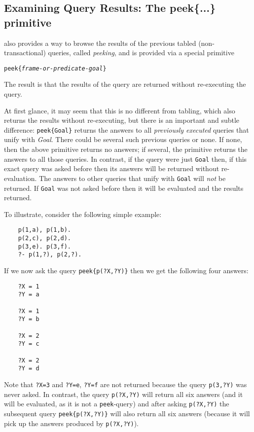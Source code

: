 
\subsection{Examining Query Results: The peek\{...\} primitive}
\label{sec-peek}

\ERGO also provides a way to browse the results of the previous tabled
(non-transactional) queries, called \emph{peeking}, and is provided via
a special primitive 
\begin{alltt}
    peek\{\textnormal{\textit{frame-or-predicate-goal}}\}
\end{alltt}
The result is that the results of the query are returned without
re-executing the query.

At first glance, it may seem that this is no different from tabling, which
also returns the results without re-executing, but there is an important
and subtle difference: \texttt{peek\{Goal\}} returns the answers to all
\emph{previously executed} queries that unify with \emph{Goal}. There could
be several such previous queries or none.   
If none, then the above primitive returns no answers; if several, the
primitive returns the answers to all those queries. In contrast, if the
query were just \texttt{Goal} then, if this exact query was asked before then
its answers will be returned without re-evaluation. The answers to other
queries that unify with \texttt{Goal} will \emph{not} be returned. If
\texttt{Goal} was not asked before then it will be evaluated and the
results returned.

To illustrate, consider the following simple example:
\begin{verbatim}
    p(1,a), p(1,b).
    p(2,c), p(2,d).
    p(3,e). p(3,f).
    ?- p(1,?), p(2,?).
\end{verbatim}
If we now ask the query \texttt{peek\{p(?X,?Y)\}} then we get the following
four answers:
\begin{verbatim}
    ?X = 1
    ?Y = a

    ?X = 1
    ?Y = b

    ?X = 2
    ?Y = c

    ?X = 2
    ?Y = d
\end{verbatim}
Note that \texttt{?X=3} and \texttt{?Y=e}, \texttt{?Y=f} are not returned
because the query \texttt{p(3,?Y)} was never asked. In contrast, the query
\texttt{p(?X,?Y)} will return all six answers (and it will be evaluated,
as it is not a \texttt{peek}-query)  and after asking
\texttt{p(?X,?Y)} the subsequent query 
\texttt{peek\{p(?X,?Y)\}} will also return all six
answers (because it will pick up the answers produced by
\texttt{p(?X,?Y)}).


